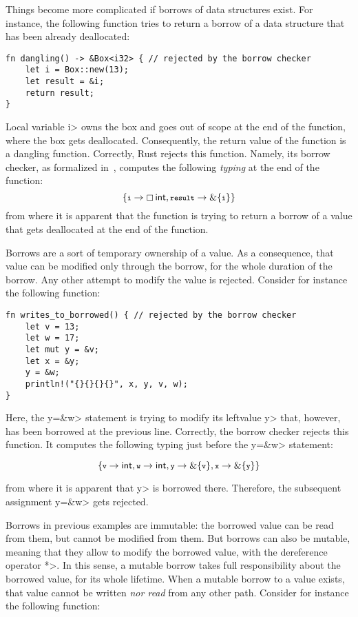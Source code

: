 Things become more complicated if borrows of data structures exist.
For instance, the following function tries to return a borrow of
a data structure that has been already deallocated:

\begin{verbatim}
fn dangling() -> &Box<i32> { // rejected by the borrow checker
    let i = Box::new(13);
    let result = &i;
    return result;
}
\end{verbatim}

\noindent
Local variable \<i> owns the box and goes out of scope at the end of the
function, where the box gets deallocated. Consequently, the return value of
the function is a dangling function. Correctly, Rust rejects this function.
Namely, its borrow checker, as formalized in~\cite{Pearce21}, computes the
following \emph{typing} at the end of the function:
\[
\{\<i>\to\boxtype{\mathsf{int},\<result>\to\borrow\{\<i>\}}\}
\]
from where it is apparent that the function is trying to return a borrow
of a value that gets deallocated at the end of the function.

Borrows are a sort of temporary ownership of a value. As a consequence,
that value can be modified only through the borrow, for the whole
duration of the borrow. Any other attempt to modify the value is rejected.
Consider for instance the following function:

\begin{verbatim}
fn writes_to_borrowed() { // rejected by the borrow checker
    let v = 13;
    let w = 17;
    let mut y = &v;
    let x = &y;
    y = &w;
    println!("{}{}{}{}", x, y, v, w);
}
\end{verbatim}

\noindent
Here, the \<y=\&w> statement is trying to modify its leftvalue \<y>
that, however, has been borrowed at the previous line. Correctly, the borrow
checker rejects this function. It computes the following typing
just before the \<y=\&w> statement:

\[
\{\<v>\to\mathsf{int},\<w>\to\mathsf{int},\<y>\to\borrow\{\<v>\},\<x>\to\borrow\{\<y>\}\}
\]

\noindent
from where it is apparent that \<y> is borrowed there. Therefore,
the subsequent assignment \<y=\&w> gets rejected.

Borrows in previous examples are immutable: the borrowed value can be read
from them, but cannot be modified from them.
But borrows can also be mutable, meaning that they allow to modify the
borrowed value, with the dereference operator \<*>. In this sense,
a mutable borrow takes full responsibility about the borrowed value, for its
whole lifetime. When a mutable borrow to a value exists, that value cannot
be written \emph{nor read} from any other path. Consider for instance
the following function:

